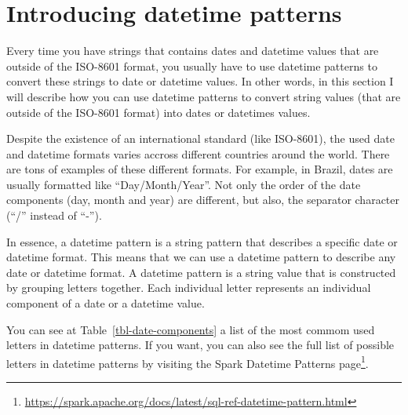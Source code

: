 \documentclass[
  11pt,
  letterpaper,
  DIV=11,
  numbers=noendperiod]{scrreprt}
\begin{document}
\hypertarget{sec-datetime-patterns}{%
\section{Introducing datetime patterns}\label{sec-datetime-patterns}}

Every time you have strings that contains dates and datetime values that
are outside of the ISO-8601 format, you usually have to use datetime
patterns to convert these strings to date or datetime values. In other
words, in this section I will describe how you can use datetime patterns
to convert string values (that are outside of the ISO-8601 format) into
dates or datetimes values.

Despite the existence of an international standard (like ISO-8601), the
used date and datetime formats varies accross different countries around
the world. There are tons of examples of these different formats. For
example, in Brazil, dates are usually formatted like ``Day/Month/Year''.
Not only the order of the date components (day, month and year) are
different, but also, the separator character (``/'' instead of ``-'').

In essence, a datetime pattern is a string pattern that describes a
specific date or datetime format. This means that we can use a datetime
pattern to describe any date or datetime format. A datetime pattern is a
string value that is constructed by grouping letters together. Each
individual letter represents an individual component of a date or a
datetime value.

You can see at Table~\ref{tbl-date-components} a list of the most commom
used letters in datetime patterns. If you want, you can also see the
full list of possible letters in datetime patterns by visiting the Spark
Datetime Patterns page\footnote{\url{https://spark.apache.org/docs/latest/sql-ref-datetime-pattern.html}}.
\end{document}

